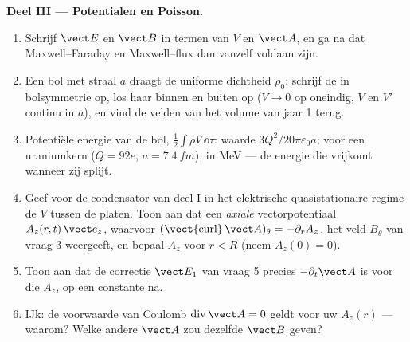 \begin{problem}
\medskip
\noindent\textbf{Deel III --- Potentialen en Poisson.}
\begin{enumerate}[resume]
  \item Schrijf $\vect E$ en $\vect B$ in termen van $V$ en $\vect A$, en ga
        na dat Maxwell--Faraday en Maxwell--flux dan vanzelf voldaan zijn.
  \item Een bol met straal $a$ draagt de uniforme dichtheid $\rho_0$:
        schrijf de  in bolsymmetrie op, los haar
        binnen en buiten op ($V \to 0$ op oneindig, $V$ en $V'$ continu in
        $a$), en vind de velden van het volume van jaar 1 terug.
  \item Potentiële energie van de bol, $\tfrac12\int\rho V\,\dd\tau$: waarde
        $3Q^2/20\pi\varepsilon_0a$; voor een uraniumkern ($Q = 92e$,
        $a =
        \qty{7.4}{fm}$), in MeV --- de energie die vrijkomt wanneer zij
        splijt.
  \item Geef voor de condensator van deel I in het elektrische
        quasistationaire regime de $V$ tussen de platen. Toon aan dat een
        \emph{axiale} vectorpotentiaal $A_z(r, t)\,\vect e_z$, waarvoor
        $(\operatorname{\vect{curl}}
        \vect A)_\theta = -\partial_rA_z$, het
        veld $B_\theta$ van vraag 3 weergeeft, en bepaal $A_z$ voor $r < R$
        (neem $A_z(0) = 0$).
  \item Toon aan dat de correctie $\vect E_1$ van vraag 5 precies
        $-\partial_t\vect A$ is voor die $A_z$, op een constante na.
  \item IJk: de voorwaarde van Coulomb $\operatorname{div}\vect A = 0$ geldt
        voor uw $A_z(r)$ --- waarom? Welke andere $\vect A$ zou dezelfde
        $\vect B$ geven?
\end{enumerate}


\end{problem}
